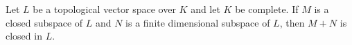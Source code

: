 Let $L$ be a topological vector space over $K$ and let $K$ be complete. If $M$ is a closed subspace of $L$ and $N$ is a finite dimensional subspace of $L$, then $M + N$ is closed in $L$.
